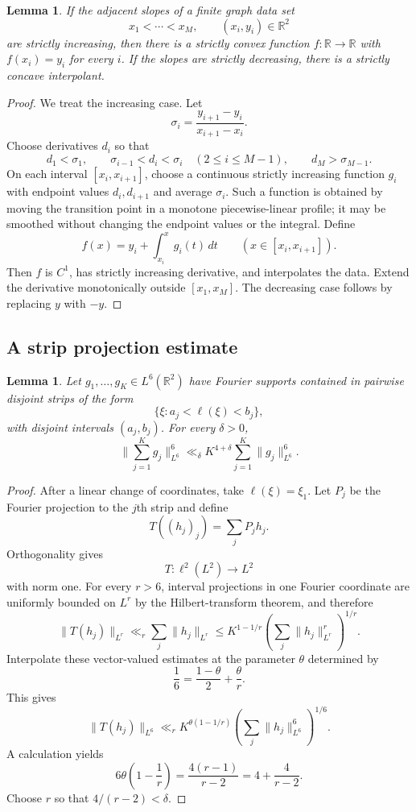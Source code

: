 \documentclass[11pt]{amsart}
\numberwithin{equation}{section}
\newtheorem{lemma}[theorem]{Lemma}
\theoremstyle{definition}
\theoremstyle{remark}
\newcommand{\R}{\mathbb R}
\newcommand{\1}{\mathbf 1}
\newcommand{\norm}[2][]{\lVert #2\rVert_{#1}}
\begin{document}
\begin{lemma}\label{lem:convex-interpolation}
If the adjacent slopes of a finite graph data set
\[
 x_1<\cdots<x_M,
 \qquad (x_i,y_i)\in\R^2
\]
are strictly increasing, then there is a strictly convex function $f:\R\to\R$ with $f(x_i)=y_i$ for every $i$.  If the slopes are strictly decreasing, there is a strictly concave interpolant.
\end{lemma}

\begin{proof}
We treat the increasing case.  Let
\[
 \sigma_i=\frac{y_{i+1}-y_i}{x_{i+1}-x_i}.
\]
Choose derivatives $d_i$ so that
\[
 d_1<\sigma_1,
 \qquad
 \sigma_{i-1}<d_i<\sigma_i\quad(2\leq i\leq M-1),
 \qquad
 d_M>\sigma_{M-1}.
\]
On each interval $[x_i,x_{i+1}]$, choose a continuous strictly increasing function $g_i$ with endpoint values $d_i,d_{i+1}$ and average $\sigma_i$.  Such a function is obtained by moving the transition point in a monotone piecewise-linear profile; it may be smoothed without changing the endpoint values or the integral.  Define
\[
 f(x)=y_i+\int_{x_i}^xg_i(t)\,dt
 \qquad(x\in[x_i,x_{i+1}]).
\]
Then $f$ is $C^1$, has strictly increasing derivative, and interpolates the data.  Extend the derivative monotonically outside $[x_1,x_M]$.  The decreasing case follows by replacing $y$ with $-y$.
\end{proof}

\subsection{A strip projection estimate}
\begin{lemma}\label{lem:L6-strips}
Let $g_1,\dots,g_K\in L^6(\R^2)$ have Fourier supports contained in pairwise disjoint strips of the form
\[
 \{\xi:a_j<\ell(\xi)<b_j\},
\]
with disjoint intervals $(a_j,b_j)$.  For every $\delta>0$,
\begin{equation}\label{eq:L6-strips}
 \norm[L^6]{\sum_{j=1}^K g_j}^6
 \ll_\delta K^{4+\delta}\sum_{j=1}^K\norm[L^6]{g_j}^6.
\end{equation}
\end{lemma}

\begin{proof}
After a linear change of coordinates, take $\ell(\xi)=\xi_1$.  Let $P_j$ be the Fourier projection to the $j$th strip and define
\[
 T((h_j)_j)=\sum_jP_jh_j.
\]
Orthogonality gives
\[
 T:\ell^2(L^2)\longrightarrow L^2
\]
with norm one.  For every $r>6$, interval projections in one Fourier coordinate are uniformly bounded on $L^r$ by the Hilbert-transform theorem, and therefore
\[
 \norm[L^r]{T(h_j)}
 \ll_r\sum_j\norm[L^r]{h_j}
 \leq K^{1-1/r}\left(\sum_j\norm[L^r]{h_j}^r\right)^{1/r}.
\]
Interpolate these vector-valued estimates at the parameter $\theta$ determined by
\[
 \frac16=\frac{1-\theta}{2}+\frac\theta r.
\]
This gives
\[
 \norm[L^6]{T(h_j)}
 \ll_r K^{\theta(1-1/r)}
 \left(\sum_j\norm[L^6]{h_j}^6\right)^{1/6}.
\]
A calculation yields
\[
 6\theta\left(1-\frac1r\right)
 =\frac{4(r-1)}{r-2}
 =4+\frac4{r-2}.
\]
Choose $r$ so that $4/(r-2)<\delta$.
\end{proof}
\end{document}
